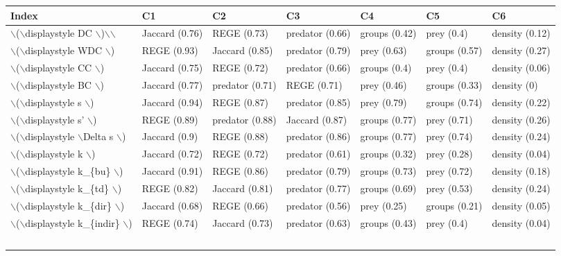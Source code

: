 \begin{table}[ht]
\centering
\begin{tabular}{lllllll}
  \hline
Index & C1 & C2 & C3 & C4 & C5 & C6 \\ 
  \hline
$\backslash$($\backslash$displaystyle DC $\backslash$)$\backslash$$\backslash$ & Jaccard (0.76) & REGE (0.73) & predator (0.66) & groups (0.42) & prey (0.4) & density (0.12) \\ 
  $\backslash$($\backslash$displaystyle WDC $\backslash$) & REGE (0.93) & Jaccard (0.85) & predator (0.79) & prey (0.63) & groups (0.57) & density (0.27) \\ 
  $\backslash$($\backslash$displaystyle CC $\backslash$) & Jaccard (0.75) & REGE (0.72) & predator (0.66) & groups (0.4) & prey (0.4) & density (0.06) \\ 
  $\backslash$($\backslash$displaystyle BC $\backslash$) & Jaccard (0.77) & predator (0.71) & REGE (0.71) & prey (0.46) & groups (0.33) & density (0) \\ 
  $\backslash$($\backslash$displaystyle s $\backslash$) & Jaccard (0.94) & REGE (0.87) & predator (0.85) & prey (0.79) & groups (0.74) & density (0.22) \\ 
  $\backslash$($\backslash$displaystyle s' $\backslash$) & REGE (0.89) & predator (0.88) & Jaccard (0.87) & groups (0.77) & prey (0.71) & density (0.26) \\ 
  $\backslash$($\backslash$displaystyle $\backslash$Delta s $\backslash$) & Jaccard (0.9) & REGE (0.88) & predator (0.86) & groups (0.77) & prey (0.74) & density (0.24) \\ 
  $\backslash$($\backslash$displaystyle k $\backslash$) & Jaccard (0.72) & REGE (0.72) & predator (0.61) & groups (0.32) & prey (0.28) & density (0.04) \\ 
  $\backslash$($\backslash$displaystyle k\_\{bu\} $\backslash$) & Jaccard (0.91) & REGE (0.86) & predator (0.79) & groups (0.73) & prey (0.72) & density (0.18) \\ 
  $\backslash$($\backslash$displaystyle k\_\{td\} $\backslash$) & REGE (0.82) & Jaccard (0.81) & predator (0.77) & groups (0.69) & prey (0.53) & density (0.24) \\ 
  $\backslash$($\backslash$displaystyle k\_\{dir\} $\backslash$) & Jaccard (0.68) & REGE (0.66) & predator (0.56) & prey (0.25) & groups (0.21) & density (0.05) \\ 
  $\backslash$($\backslash$displaystyle k\_\{indir\} $\backslash$) & REGE (0.74) & Jaccard (0.73) & predator (0.63) & groups (0.43) & prey (0.4) & density (0.04) \\ 
$$
\end{tabular}
\end{table}
